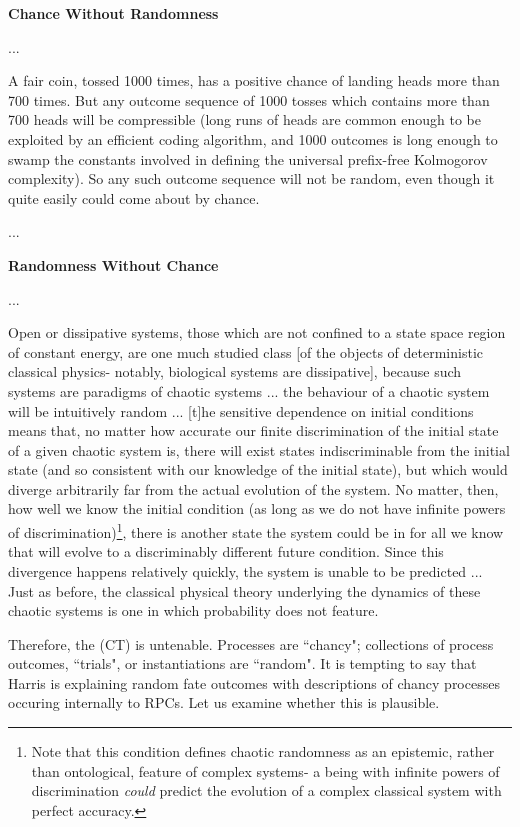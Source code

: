 \begin{longquote}
\textbf{Chance Without Randomness}

...

A fair coin, tossed 1000 times, has a positive chance of landing heads more than 700 times. But any outcome sequence of 1000 tosses which contains more than 700 heads will be compressible (long runs of heads are common enough to be exploited by an efficient coding algorithm, and 1000 outcomes is long enough to swamp the constants involved in defining the universal prefix-free Kolmogorov complexity). So any such outcome sequence will not be random, even though it quite easily could come about by chance. 

...

\textbf{Randomness Without Chance}

...

Open or dissipative systems, those which are not confined to a state space region of constant energy, are one much studied class [of the objects of deterministic classical physics- notably, biological systems are dissipative], because such systems are paradigms of chaotic systems ... the behaviour of a chaotic system will be intuitively random ... [t]he sensitive dependence on initial conditions means that, no matter how accurate our finite discrimination of the initial state of a given chaotic system is, there will exist states indiscriminable from the initial state (and so consistent with our knowledge of the initial state), but which would diverge arbitrarily far from the actual evolution of the system. No matter, then, how well we know the initial condition (as long as we do not have infinite powers of discrimination)\footnote{Note that this condition defines chaotic randomness as an epistemic, rather than ontological, feature of complex systems- a being with infinite powers of discrimination \textit{could} predict the evolution of a complex classical system with perfect accuracy.}, there is another state the system could be in for all we know that will evolve to a discriminably different future condition. Since this divergence happens relatively quickly, the system is unable to be predicted ... Just as before, the classical physical theory underlying the dynamics of these chaotic systems is one in which probability does not feature. 
\cite{Eagle2018}
\end{longquote}

Therefore, the (CT) is untenable. Processes are ``chancy"; collections of process outcomes, ``trials", or instantiations are ``random". It is tempting to say that Harris is explaining random fate outcomes with descriptions of chancy processes occuring internally to RPCs. Let us examine whether this is plausible. 

